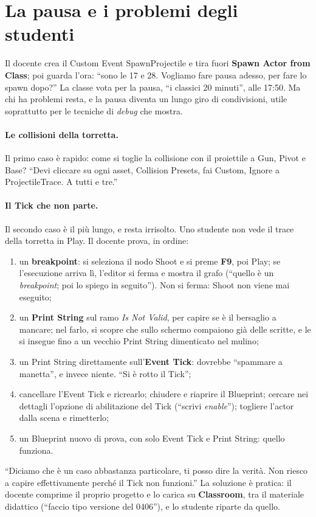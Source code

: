 \section{La pausa e i problemi degli studenti}
\label{ue5:sec:pausa}

Il docente crea il Custom Event SpawnProjectile e tira fuori \textbf{Spawn Actor from
Class}; poi guarda l'ora: ``sono le 17 e 28. Vogliamo fare pausa adesso, per fare lo
spawn dopo?'' La classe vota per la pausa, ``i classici 20 minuti'', alle 17:50. Ma chi
ha problemi resta, e la pausa diventa un lungo giro di condivisioni, utile soprattutto
per le tecniche di \emph{debug} che mostra.

\paragraph{Le collisioni della torretta.} Il primo caso è rapido: come si toglie la
collisione con il proiettile a Gun, Pivot e Base? ``Devi cliccare su ogni asset,
Collision Presets, fai Custom, Ignore a ProjectileTrace. A tutti e tre.''

\paragraph{Il Tick che non parte.} Il secondo caso è il più lungo, e resta irrisolto.
Uno studente non vede il trace della torretta in Play. Il docente prova, in ordine:
\begin{enumerate}
  \item un \textbf{breakpoint}: si seleziona il nodo Shoot e si preme \textbf{F9}, poi
        Play; se l'esecuzione arriva lì, l'editor si ferma e mostra il grafo (``quello è
        un \emph{breakpoint}; poi lo spiego in seguito''). Non si ferma: Shoot non viene
        mai eseguito;
  \item un \textbf{Print String} sul ramo \emph{Is Not Valid}, per capire se è il
        bersaglio a mancare; nel farlo, si scopre che sullo schermo compaiono già delle
        scritte, e le si insegue fino a un vecchio Print String dimenticato nel mulino;
  \item un Print String direttamente sull'\textbf{Event Tick}: dovrebbe ``spammare a
        manetta'', e invece niente. ``Si è rotto il Tick'';
  \item cancellare l'Event Tick e ricrearlo; chiudere e riaprire il Blueprint; cercare
        nei dettagli l'opzione di abilitazione del Tick (``scrivi \emph{enable}'');
        togliere l'actor dalla scena e rimetterlo;
  \item un Blueprint nuovo di prova, con solo Event Tick e Print String: quello
        funziona.
\end{enumerate}
``Diciamo che è un caso abbastanza particolare, ti posso dire la verità. Non riesco a
capire effettivamente perché il Tick non funzioni.'' La soluzione è pratica: il docente
comprime il proprio progetto e lo carica su \textbf{Classroom}, tra il materiale
didattico (``faccio tipo versione del 0406''), e lo studente riparte da quello.

